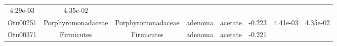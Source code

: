 \documentclass[11pt,]{article}
\begin{document}
\begin{longtable}[]{@{}cccccccc@{}}
\begin{minipage}[t]{0.08\columnwidth}
4.29e-03\strut
\end{minipage} & \begin{minipage}[t]{0.08\columnwidth}\centering\strut
4.35e-02\strut
\end{minipage}\tabularnewline
\begin{minipage}[t]{0.08\columnwidth}\centering\strut
Otu00251\strut
\end{minipage} & \begin{minipage}[t]{0.15\columnwidth}\centering\strut
Porphyromonadaceae\strut
\end{minipage} & \begin{minipage}[t]{0.15\columnwidth}\centering\strut
Porphyromonadaceae\strut
\end{minipage} & \begin{minipage}[t]{0.08\columnwidth}\centering\strut
adenoma\strut
\end{minipage} & \begin{minipage}[t]{0.09\columnwidth}\centering\strut
acetate\strut
\end{minipage} & \begin{minipage}[t]{0.07\columnwidth}\centering\strut
-0.223\strut
\end{minipage} & \begin{minipage}[t]{0.08\columnwidth}\centering\strut
4.41e-03\strut
\end{minipage} & \begin{minipage}[t]{0.08\columnwidth}\centering\strut
4.35e-02\strut
\end{minipage}\tabularnewline
\begin{minipage}[t]{0.08\columnwidth}\centering\strut
Otu00371\strut
\end{minipage} & \begin{minipage}[t]{0.15\columnwidth}\centering\strut
Firmicutes\strut
\end{minipage} & \begin{minipage}[t]{0.15\columnwidth}\centering\strut
Firmicutes\strut
\end{minipage} & \begin{minipage}[t]{0.08\columnwidth}\centering\strut
adenoma\strut
\end{minipage} & \begin{minipage}[t]{0.09\columnwidth}\centering\strut
acetate\strut
\end{minipage} & \begin{minipage}[t]{0.07\columnwidth}\centering\strut
-0.221\strut
\end{minipage} & \begin{minipage}[t]{0.08\columnwidth}\centering\strut

\end{minipage}
\end{longtable}
\end{document}
